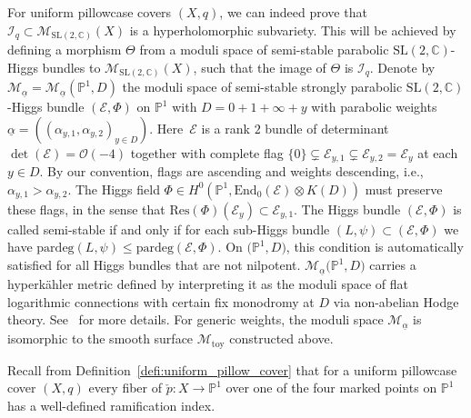 \documentclass[pdftex]{sigma}
\numberwithin{equation}{section}
\theoremstyle{definition}
\newcommand{\End}{\mathrm{End}}
\newcommand{\Res}{\mathrm{Res}}
\newcommand{\pardeg}{\mathrm{pardeg}}
\newcommand{\toy}{\mathrm{toy}}
\renewcommand{\to}{\rightarrow}
\newcommand{\ualpha}{\underline{\alpha}}
\newcommand{\calE}{\mathcal{E}}
\newcommand{\calI}{\mathcal{I}}
\newcommand{\calM}{\mathcal{M}}
\newcommand{\calO}{\mathcal{O}}
\newcommand{\CC}{\mathbb{C}}
\newcommand{\PP}{\mathbb{P}}
\newcommand{\SL}{\mathrm{SL}}
\begin{document}
For uniform pillowcase covers $(X,q)$, we can indeed prove that $\calI_q \subset \calM_{\SL(2,\CC)}(X)$ is a hyperholomorphic subvariety. This will be achieved by defining a morphism $\Theta$ from a moduli space of semi-stable parabolic $\SL(2,\CC)$-Higgs bundles to $\calM_{\SL(2,\CC)}(X)$, such that the image of $\Theta$ is $\calI_q$. Denote by $\calM_{\ualpha}=\calM_{\ualpha}(\PP^1,D)$ the moduli space of semi-stable strongly parabolic $\SL(2,\CC)$-Higgs bundle $(\calE,\Phi)$ on $\PP^1$ with $D=0+1+\infty+y$ with parabolic weights $\ualpha=\left((\alpha_{y,1},\alpha_{y,2})_{y \in D}\right)$. Here~$\calE$ is a rank $2$ bundle of determinant $\det(\calE)=\calO(-4)$ together with complete flag $\{0 \} \subsetneq \calE_{y,1} \subsetneq \calE_{y,2}= \calE_y$ at each $y \in D$. By our convention, flags are ascending and weights descending, i.e., $\alpha_{y,1} > \alpha_{y,2}$. The Higgs field $\Phi \in H^0(\PP^1,\End_0(\calE)\otimes K(D))$ must preserve these flags, in the sense that $\Res(\Phi)(\calE_y) \subset \calE_{y,1}$. The Higgs bundle $(\calE,\Phi)$ is called semi-stable if and only if for each sub-Higgs bundle $(L,\psi) \subset (\calE,\Phi)$ we have $\pardeg(L,\psi)\leq \pardeg(\calE,\Phi)$. On $\bigl(\PP^1,D\bigr)$, this condition is automatically satisfied for all Higgs bundles that are not nilpotent. $\calM_{\ualpha}\bigl(\PP^1,D\bigr)$ carries a hyperk\"ahler metric defined by interpreting it as the moduli space of flat logarithmic connections with certain fix monodromy at $D$ via non-abelian Hodge theory. See~\cite{FMSW} for more details. For generic weights, the moduli space $\calM_{\underline{\alpha}}$ is isomorphic to the smooth surface $\calM_{\toy}$ constructed above.

Recall from Definition~\ref{defi:uniform_pillow_cover} that for a uniform pillowcase cover $(X,q)$ every fiber of $\check{p}\colon X \to \PP^1$ over one of the four marked points on $\PP^1$ has a well-defined ramification index.
\end{document}
